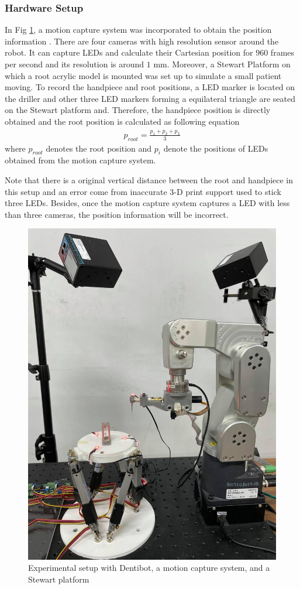 \subsubsection{Hardware Setup}
\hspace*{6mm}In Fig \ref{fig:system}, a motion capture system was incorporated to obtain the position information \cite{web8}. There are four cameras with high resolution sensor around the robot. It can capture LEDs and calculate their Cartesian position for $960$ frames per second and its resolution is around $1$ mm. Moreover, a Stewart Platform on which a root acrylic model is mounted was set up to simulate a small patient moving. To record the handpiece and root positions, a LED marker is located on the driller and other three LED markers forming a equilateral triangle are seated on the Stewart platform and. Therefore, the handpiece position is directly obtained and the root position is calculated as following equation
\begin{equation*}
\begin{split}
p_{root} = \frac{p_{1} + p_{2} + p_{3}}{3}
\end{split}
\end{equation*}
where $p_{root}$ denotes the root position and $p_{i}$ denote the positions of LEDs obtained from the motion capture system. 
\par
Note that there is a original vertical distance between the root and handpiece in this setup and an error come from inaccurate 3-D print support used to stick three LEDs. Besides, once the motion capture system captures a LED with less than three cameras, the position information will be incorrect. 
\begin{figure}[htbp]
\begin{center}
\includegraphics[width=0.7\linewidth]{Images/System.jpg}
\caption{Experimental setup with Dentibot, a motion capture system, and a Stewart platform}
\label{fig:system}
\end{center}
\end{figure}
